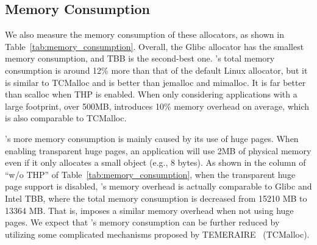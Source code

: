 \subsection{Memory Consumption}
\label{sec:memory}



We also measure the memory consumption of these allocators, as shown in Table~\ref{tab:memory_consumption}.
Overall, the Glibc allocator has the smallest memory consumption, and TBB is the second-best one. \NM{}'s total memory consumption is around 12\% more than that of the default Linux allocator, but it is similar to TCMalloc and is better than jemalloc and mimalloc. It is far better than scalloc when THP is enabled. When only considering applications with a large footprint, over 500MB, \NM{} introduces 10\% memory overhead on average, which is also comparable to TCMalloc.  

\NM{}'s more memory consumption is mainly caused by its use of huge pages. When enabling transparent huge pages, an application will use 2MB of physical memory even if it only allocates a small object (e.g., 8 bytes). As shown in the column of ``w/o THP'' of Table~\ref{tab:memory_consumption}, when the transparent huge page support is disabled, \NM{}'s memory overhead is actually comparable to Glibc and Intel TBB, where the total memory consumption is decreased from 15210 MB to 13364 MB. That is, \NM{} imposes a similar memory overhead when not using huge pages. We expect that \NM{}'s memory consumption can be further reduced by utilizing some complicated mechanisms proposed by TEMERAIRE~\cite{TEMERAIRE} (TCMalloc).   

